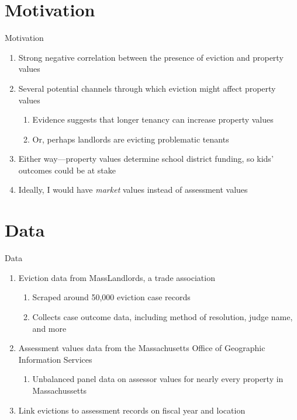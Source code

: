 \documentclass [xcolor=svgnames, t] {beamer}
\begin{document}
\section{Motivation}


\begin{frame}{Motivation}
\begin{enumerate}
    \item Strong negative correlation between the presence of eviction and property values
    \item Several potential channels through which eviction might affect property values
    \begin{enumerate}
        \item Evidence suggests that longer tenancy can increase property values
        \item Or, perhaps landlords are evicting problematic tenants
    \end{enumerate}
    \item Either way—property values determine school district 
    funding, so kids' outcomes could be at stake
    \item Ideally, I would have \emph{market} values instead of assessment values
\end{enumerate}
\end{frame}

\section{Data}
\begin{frame}{Data}
    \begin{enumerate}
        \item Eviction data from MassLandlords, a trade association
        \begin{enumerate}
            \item Scraped around 50,000 eviction case records
            \item Collects case outcome data, including method of resolution, judge name, and more
        \end{enumerate}
        \item Assessment values data from the Massachusetts Office of Geographic Information Services
        \begin{enumerate}
            \item Unbalanced panel data on assessor values for nearly every property in Massachussetts
        \end{enumerate}
        \item Link evictions to assessment records on fiscal year and location
    \end{enumerate}
\end{frame}
\end{document}
